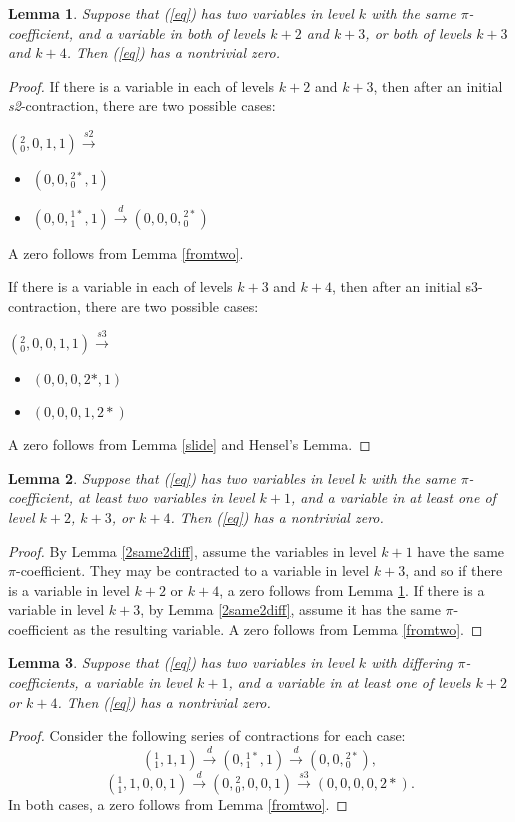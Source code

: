 \documentclass[12pt]{amsart}
\newtheorem{lemma}{Lemma}
\begin{document}
\begin{lemma}\label{2same2more}
Suppose that (\ref{eq}) has two variables in level $k$ with the same $\pi$-coefficient, and a variable in both of levels $k+2$ and $k+3$, or both of levels $k+3$ and $k+4$.  Then (\ref{eq}) has a nontrivial zero.
\end{lemma}
\begin{proof}
If there is a variable in each of levels $k+2$ and $k+3$, then after an initial \textit{s2}-contraction, there are two possible cases:

$({}^{2}_{0}, 0, 1, 1) \xrightarrow{s2}$
\begin{itemize}
    \item $(0, 0, {}^{2*}_{0}, 1)$
    \item $(0, 0, {}^{1*}_{1}, 1) \xrightarrow{d} (0, 0, 0, {}^{2*}_{0})$
\end{itemize}
A zero follows from Lemma \ref{fromtwo}.

If there is a variable in each of levels $k+3$ and $k+4$, then after an initial s3-contraction, there are two possible cases:

$({}^{2}_{0}, 0, 0, 1, 1) \xrightarrow{s3}$
\begin{itemize}
    \item $(0, 0, 0,2*, 1)$
    \item $(0, 0, 0,1, 2*)$
\end{itemize}
A zero follows from Lemma \ref{slide} and Hensel's Lemma.
\end{proof}

\begin{lemma} \label{2and2and1}
Suppose that (\ref{eq}) has two variables in level $k$ with the same $\pi$-coefficient, at least two variables in level $k+1$, and a variable in at least one of level $k+2$, $k+3$, or $k+4$.  Then (\ref{eq}) has a nontrivial zero.
\end{lemma}
\begin{proof}
By Lemma \ref{2same2diff}, assume the variables in level $k+1$ have the same $\pi$-coefficient.  They may be contracted to a variable in level $k+3$, and so if there is a variable in level $k+2$ or $k+4$, a zero follows from Lemma \ref{2same2more}.  If there is a variable in level $k+3$, by Lemma \ref{2same2diff}, assume it has the same $\pi$-coefficient as the resulting variable.  A zero follows from Lemma \ref{fromtwo}.
\end{proof}

\begin{lemma}\label{2diff2more}
Suppose that (\ref{eq}) has two variables in level $k$ with differing $\pi$-coefficients, a variable in level $k+1$, and a variable in at least one of levels $k+2$ or $k+4$.  Then (\ref{eq}) has a nontrivial zero.

\end{lemma}
\begin{proof}
Consider the following series of contractions for each case:
$$({}^{1}_{1}, 1, 1) \xrightarrow{d} (0, {}^{1*}_{1}, 1) \xrightarrow{d} (0, 0, {}^{2*}_{0}),$$
$$({}^{1}_{1}, 1, 0, 0, 1) \xrightarrow{d} (0, {}^{2}_{0}, 0, 0, 1) \xrightarrow{s3} (0, 0, 0, 0, 2*).$$
In both cases, a zero follows from Lemma \ref{fromtwo}.
\end{proof}
\end{document}
